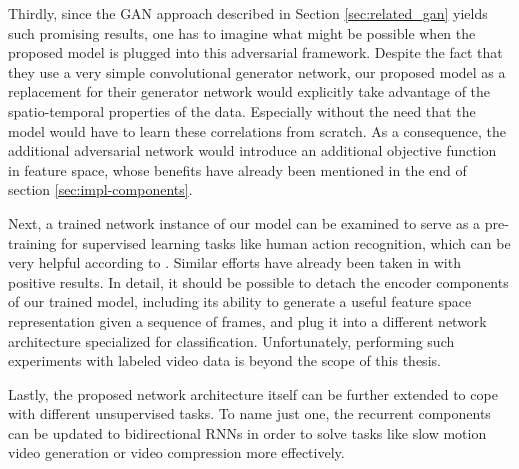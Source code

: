 Thirdly, since the GAN approach described in Section \ref{sec:related_gan} yields such promising results, one has to imagine what might be possible when the proposed model is plugged into this adversarial framework. Despite the fact that they use a very simple convolutional generator network, our proposed model as a replacement for their generator network would explicitly take advantage of the spatio-temporal properties of the data. Especially without the need that the model would have to learn these correlations from scratch. As a consequence, the additional adversarial network would introduce an additional objective function in feature space, whose benefits have already been mentioned in the end of section \ref{sec:impl-components}.

Next, a trained network instance of our model can be examined to serve as a pre-training for supervised learning tasks like human action recognition, which can be very helpful according to \parencite[p. 20]{deep_arch_ai}. Similar efforts have already been taken in \parencite{unsup_learn_lstm} with positive results. In detail, it should be possible to detach the encoder components of our trained model, including its ability to generate a useful feature space representation given a sequence of frames, and plug it into a different network architecture specialized for classification. Unfortunately, performing such experiments with labeled video data is beyond the scope of this thesis.

Lastly, the proposed network architecture itself can be further extended to cope with different unsupervised tasks. To name just one, the recurrent components can be updated to bidirectional RNNs in order to solve tasks like slow motion video generation or video compression more effectively.